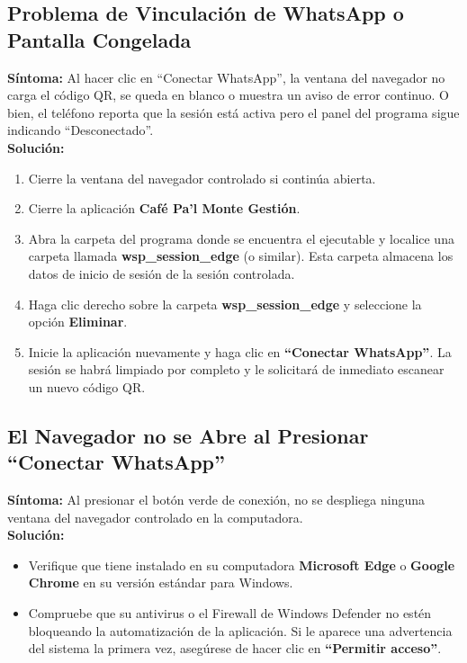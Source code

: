 \documentclass[11pt,a4paper]{article}
\begin{document}
\subsection{Problema de Vinculación de WhatsApp o Pantalla Congelada}
\textbf{Síntoma:} Al hacer clic en ``Conectar WhatsApp'', la ventana del navegador no carga el código QR, se queda en blanco o muestra un aviso de error continuo. O bien, el teléfono reporta que la sesión está activa pero el panel del programa sigue indicando ``Desconectado''.\\
\textbf{Solución:}
\begin{enumerate}
    \item Cierre la ventana del navegador controlado si continúa abierta.
    \item Cierre la aplicación \textbf{Café Pa'l Monte Gestión}.
    \item Abra la carpeta del programa donde se encuentra el ejecutable y localice una carpeta llamada \textbf{wsp\_session\_edge} (o similar). Esta carpeta almacena los datos de inicio de sesión de la sesión controlada.
    \item Haga clic derecho sobre la carpeta \textbf{wsp\_session\_edge} y seleccione la opción \textbf{Eliminar}.
    \item Inicie la aplicación nuevamente y haga clic en \textbf{``Conectar WhatsApp''}. La sesión se habrá limpiado por completo y le solicitará de inmediato escanear un nuevo código QR.
\end{enumerate}

\subsection{El Navegador no se Abre al Presionar ``Conectar WhatsApp''}
\textbf{Síntoma:} Al presionar el botón verde de conexión, no se despliega ninguna ventana del navegador controlado en la computadora.\\
\textbf{Solución:}
\begin{itemize}
    \item Verifique que tiene instalado en su computadora \textbf{Microsoft Edge} o \textbf{Google Chrome} en su versión estándar para Windows.
    \item Compruebe que su antivirus o el Firewall de Windows Defender no estén bloqueando la automatización de la aplicación. Si le aparece una advertencia del sistema la primera vez, asegúrese de hacer clic en \textbf{``Permitir acceso''}.
\end{itemize}
\end{document}
